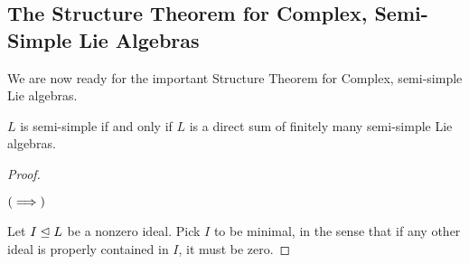\subsection{The Structure Theorem for Complex, Semi-Simple Lie Algebras}

We are now ready for the important Structure Theorem for Complex, semi-simple Lie algebras.

\begin{boxtheorem}\label{SP:Thm:Structure}
    $L$ is semi-simple if and only if $L$ is a direct sum of finitely many semi-simple Lie algebras.
\end{boxtheorem}

\begin{proof}
    \begin{description}
        \item[$\left( \implies \right)$] 
    \end{description}
    Let $I \trianglelefteq L$ be a nonzero ideal. Pick $I$ to be minimal, in the sense that if any other ideal is properly contained in $I$, it must be zero.
    \sorry %

\end{proof}
